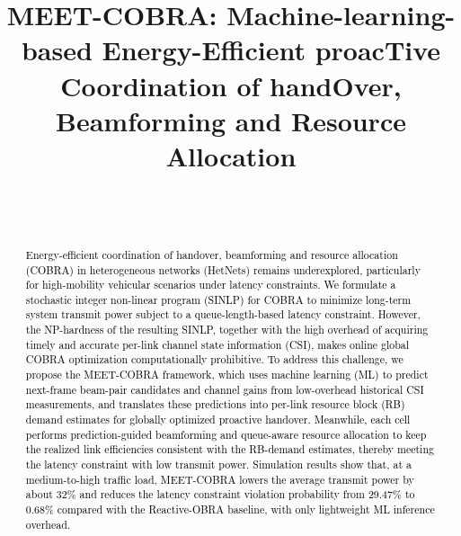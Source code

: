 \documentclass[conference, a4paper]{IEEEtran}
\theoremstyle{remark}
\begin{document}
\title{MEET-COBRA: Machine-learning-based Energy-Efficient proacTive Coordination of handOver, Beamforming and Resource Allocation}


\author{\\
 \\
}

\maketitle

\begin{abstract}
\textcolor{black}{
Energy-efficient coordination of handover, beamforming and resource allocation (COBRA) in heterogeneous networks (HetNets) remains underexplored, particularly for high-mobility vehicular scenarios under latency constraints.
We formulate a stochastic integer non-linear program (SINLP) for COBRA to minimize long-term system transmit power subject to a queue-length-based latency constraint.
However, the NP-hardness of the resulting SINLP, together with the high overhead of acquiring timely and accurate per-link channel state information (CSI), makes online global COBRA optimization computationally prohibitive.
To address this challenge, we propose the MEET-COBRA framework, which uses machine learning (ML) to predict next-frame beam-pair candidates and channel gains from low-overhead historical CSI measurements, and translates these predictions into per-link resource block (RB) demand estimates for globally optimized proactive handover. 
Meanwhile, each cell performs prediction-guided beamforming and queue-aware resource allocation to keep the realized link efficiencies consistent with the RB-demand estimates, thereby meeting the latency constraint with low transmit power.
Simulation results show that, at a medium-to-high traffic load, MEET-COBRA lowers the average transmit power by about 32\% and reduces the latency constraint violation probability from 29.47\% to 0.68\% compared with the Reactive-OBRA baseline, with only lightweight ML inference overhead.
}
\end{abstract}
\end{document}
